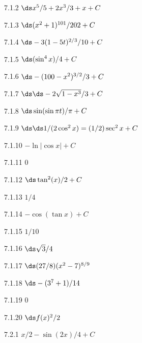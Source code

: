 \begin{Answer}{7.1.2}
 $\ds x^5/5+2x^3/3+x+C$
\end{Answer}
\begin{Answer}{7.1.3}
 $\ds (x^2+1)^{101}/202+C$
\end{Answer}
\begin{Answer}{7.1.4}
 $\ds -3(1-5t)^{2/3}/10+C$
\end{Answer}
\begin{Answer}{7.1.5}
 $\ds (\sin^4x)/4+C$
\end{Answer}
\begin{Answer}{7.1.6}
 $\ds -(100-x^2)^{3/2}/3+C$
\end{Answer}
\begin{Answer}{7.1.7}
 $\ds \ds -2\sqrt{1-x^3}/3+C$
\end{Answer}
\begin{Answer}{7.1.8}
 $\ds \sin(\sin\pi t)/\pi+C$
\end{Answer}
\begin{Answer}{7.1.9}
 $\ds \ds 1/(2\cos^2 x)=(1/2)\sec^2x+C$
\end{Answer}
\begin{Answer}{7.1.10}
 $-\ln|\cos x|+C$
\end{Answer}
\begin{Answer}{7.1.11}
 $0$
\end{Answer}
\begin{Answer}{7.1.12}
 $\ds \tan^2(x)/2+C$
\end{Answer}
\begin{Answer}{7.1.13}
 $1/4$
\end{Answer}
\begin{Answer}{7.1.14}
 $-\cos(\tan x)+C$
\end{Answer}
\begin{Answer}{7.1.15}
 $1/10$
\end{Answer}
\begin{Answer}{7.1.16}
 $\ds \sqrt3/4$
\end{Answer}
\begin{Answer}{7.1.17}
 $\ds (27/8)(x^2-7)^{8/9}$
\end{Answer}
\begin{Answer}{7.1.18}
 $\ds -(3^7+1)/14$
\end{Answer}
\begin{Answer}{7.1.19}
 $0$
\end{Answer}
\begin{Answer}{7.1.20}
 $\ds f(x)^2/2$
\end{Answer}
\begin{Answer}{7.2.1}
 $x/2-\sin(2x)/4+C$
\end{Answer}

